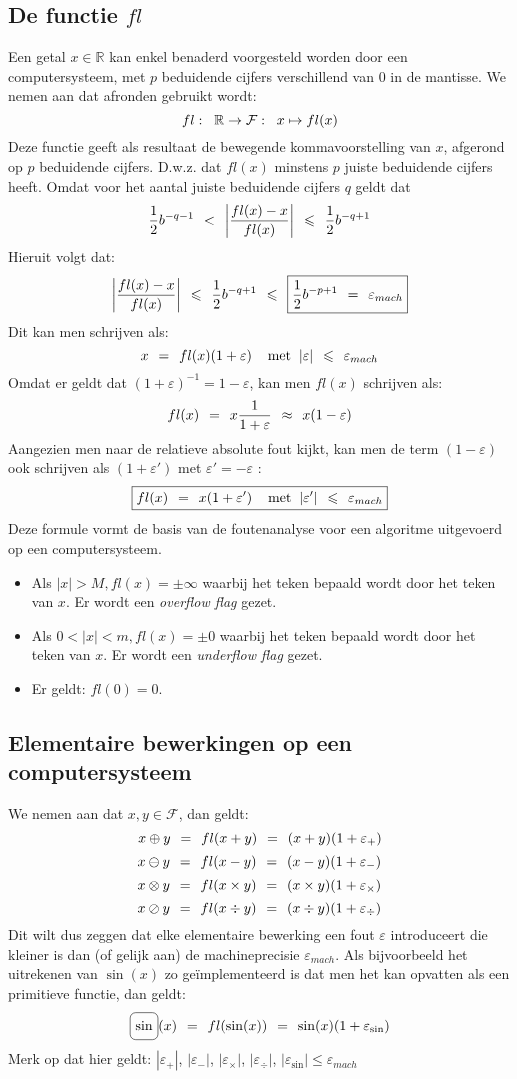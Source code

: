 \documentclass[11pt]{report}
\def \eq {\hspace{1.5mm}=\hspace{1.5mm}}
\def \lesseq {\hspace{1.5mm}\leqslant\hspace{1.5mm}}
\def \less {\hspace{1.5mm}<\hspace{1.5mm}}
\def \appx {\hspace{1.5mm}\approx \hspace{1.5mm}}
\def \h {\hspace{2mm}}
\def \R {\mathbb{R}}
\def \F {\mathcal{F}}
\newcommand{\rect}[1]{%
  \tikz[baseline=(char.base)]\node[anchor=south west, draw,rectangle, rounded corners, inner sep=2pt, minimum size=7mm,
    text height=2mm](char){\ensuremath{#1}} ;}
\begin{document}
	\subsection*{De functie $fl$}
		Een getal $x \in \R$ kan enkel benaderd voorgesteld worden door een computersysteem, met $p$ beduidende cijfers verschillend van 0 in de mantisse. We nemen aan dat afronden gebruikt wordt:
		$$fl: \h \R \to \F: \h x \mapsto fl(x)$$
		Deze functie geeft als resultaat de bewegende kommavoorstelling van $x$, afgerond op $p$ beduidende cijfers. D.w.z. dat $fl(x)$ minstens $p$ juiste beduidende cijfers heeft. Omdat voor het aantal juiste beduidende cijfers $q$ geldt dat 
		$$\frac{1}{2}b^{-q-1} \less \left|\frac{fl(x) - x}{fl(x)}\right| \lesseq \frac{1}{2}b^{-q+1}$$
		Hieruit volgt dat:
		$$\left|\frac{fl(x) - x}{fl(x)}\right|\lesseq \frac{1}{2}b^{-q+1}\lesseq \boxed{\frac{1}{2}b^{-p+1} \eq \varepsilon_{mach}}$$
		Dit kan men schrijven als:
		$$x \eq fl(x) (1 + \varepsilon) \h\h \text{met}\h |\varepsilon|\lesseq \varepsilon_{mach}$$ 
		Omdat er geldt dat $(1 + \varepsilon)^{-1} = 1 - \varepsilon $, kan men $fl(x)$ schrijven als:
		$$fl(x) \eq x\frac{1}{1 + \varepsilon} \appx x(1 - \varepsilon)$$
		Aangezien men naar de relatieve absolute fout kijkt, kan men de term $(1-\varepsilon)$ ook schrijven als $(1+\varepsilon')$ met $\varepsilon' = -\varepsilon$ :
		$$\boxed{fl(x) \eq x(1 + \varepsilon') \h\h \text{met} \h |\varepsilon'| \lesseq \varepsilon_{mach}}$$
		Deze formule vormt de basis van de foutenanalyse voor een algoritme uitgevoerd op een computersysteem.
		\begin{itemize}
			\item Als $|x| > M, fl(x) = \pm \infty$ waarbij het teken bepaald wordt door het teken van $x$. Er wordt een \textit{overflow flag} gezet.
			\item Als $0 < |x| < m, fl(x) = \pm 0$ waarbij het teken bepaald wordt door het teken van $x$. Er wordt een \textit{underflow flag} gezet.
			\item Er geldt: $fl(0) = 0$.
		\end{itemize}
	\subsection{Elementaire bewerkingen op een computersysteem}
		We nemen aan dat $x, y \in \F$, dan geldt:
		$$x \oplus y \eq fl(x + y) \eq (x + y)(1 + \varepsilon_+)$$
		$$x \ominus y \eq fl(x - y) \eq (x - y)(1 + \varepsilon_-)$$
		$$x \otimes y \eq fl(x \times y) \eq (x \times y)(1 + \varepsilon_\times)$$
		$$x \oslash y \eq fl(x \div y) \eq (x \div y)(1 + \varepsilon_\div)$$
		Dit wilt dus zeggen dat elke elementaire bewerking een fout $\varepsilon$ introduceert die kleiner is dan (of gelijk aan) de machineprecisie $\varepsilon_{mach}$. Als bijvoorbeeld het uitrekenen van $\sin(x)$ zo ge\"{i}mplementeerd is dat men het kan opvatten als een primitieve functie, dan geldt:
	 	$$\rect{\sin}(x) \eq fl(\sin(x)) \eq \sin(x)(1 + \varepsilon_{\sin})$$
	 	Merk op dat hier geldt: $|\varepsilon_+|$, $|\varepsilon_-|$, $|\varepsilon_\times|$, $|\varepsilon_\div|$, $|\varepsilon_{\sin}| \leqslant \varepsilon_{mach}$ 
	 	
\end{document}
